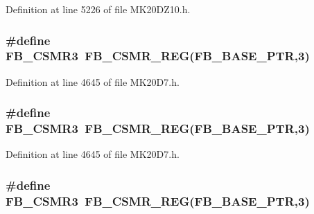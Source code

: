 Definition at line 5226 of file M\+K20\+D\+Z10.\+h.

\subsubsection[{\texorpdfstring{F\+B\+\_\+\+C\+S\+M\+R3}{FB_CSMR3}}]{\setlength{\rightskip}{0pt plus 5cm}\#define F\+B\+\_\+\+C\+S\+M\+R3~{\bf F\+B\+\_\+\+C\+S\+M\+R\+\_\+\+R\+EG}({\bf F\+B\+\_\+\+B\+A\+S\+E\+\_\+\+P\+TR},3)}\hypertarget{group___f_b___register___accessor___macros_gae1a4303b901ac766293493b58fe2e501}{}\label{group___f_b___register___accessor___macros_gae1a4303b901ac766293493b58fe2e501}


Definition at line 4645 of file M\+K20\+D7.\+h.

\subsubsection[{\texorpdfstring{F\+B\+\_\+\+C\+S\+M\+R3}{FB_CSMR3}}]{\setlength{\rightskip}{0pt plus 5cm}\#define F\+B\+\_\+\+C\+S\+M\+R3~{\bf F\+B\+\_\+\+C\+S\+M\+R\+\_\+\+R\+EG}({\bf F\+B\+\_\+\+B\+A\+S\+E\+\_\+\+P\+TR},3)}\hypertarget{group___f_b___register___accessor___macros_gae1a4303b901ac766293493b58fe2e501}{}\label{group___f_b___register___accessor___macros_gae1a4303b901ac766293493b58fe2e501}


Definition at line 4645 of file M\+K20\+D7.\+h.

\subsubsection[{\texorpdfstring{F\+B\+\_\+\+C\+S\+M\+R3}{FB_CSMR3}}]{\setlength{\rightskip}{0pt plus 5cm}\#define F\+B\+\_\+\+C\+S\+M\+R3~{\bf F\+B\+\_\+\+C\+S\+M\+R\+\_\+\+R\+EG}({\bf F\+B\+\_\+\+B\+A\+S\+E\+\_\+\+P\+TR},3)}\hypertarget{group___f_b___register___accessor___macros_gae1a4303b901ac766293493b58fe2e501}{}\label{group___f_b___register___accessor___macros_gae1a4303b901ac766293493b58fe2e501}


